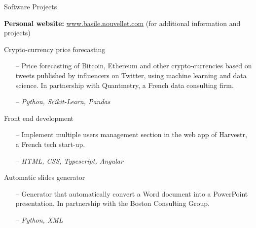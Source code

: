 \documentclass[]{mcdowellcv}
\begin{document}
    \begin{cvsection}{Software Projects}

        \begin{adjustwidth}{\subsectionmargin}{\subsectionmargin}
            \textbf{Personal website:} \url{www.basile.nouvellet.com} (for additional information and projects)
        \end{adjustwidth}

        \begin{cvsubsection}{Crypto-currency price forecasting}{}{}
            \begin{itemize}
                \item[--] Price forecasting of Bitcoin, Ethereum and other crypto-currencies based on tweets published by influencers on Twitter, using machine learning and data science.
                In partnership with Quantmetry, a French data consulting firm.
                \item[--] \textit{Python, Scikit-Learn, Pandas}
            \end{itemize}
        \end{cvsubsection}

        \begin{cvsubsection}{Front end development}{}{}
            \begin{itemize}
                \item[--] Implement multiple users management section in the web app of Harvestr, a French tech start-up.
                \item[--] \textit{HTML, CSS, Typescript, Angular}
            \end{itemize}
        \end{cvsubsection}

        \begin{cvsubsection}{Automatic slides generator}{}{}
            \begin{itemize}
                \item[--] Generator that automatically convert a Word document into a PowerPoint presentation.
                In partnership with the Boston Consulting Group.
                \item[--] \textit{Python, XML}
            \end{itemize}
        \end{cvsubsection}


\end{cvsection}
\end{document}

